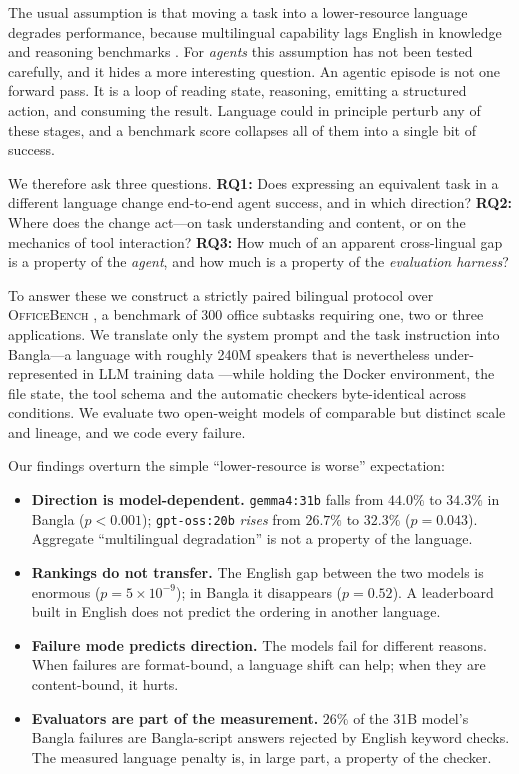 \documentclass[11pt]{article}
\begin{document}
The usual assumption is that moving a task into a lower-resource language degrades performance,
because multilingual capability lags English in knowledge and reasoning benchmarks
\citep{ahuja2023mega,shi2023mgsm,bandarkar2024belebele,huang2023notall}. For \emph{agents} this
assumption has not been tested carefully, and it hides a more interesting question. An agentic
episode is not one forward pass. It is a loop of reading state, reasoning, emitting a
structured action, and consuming the result. Language could in principle perturb any of these
stages, and a benchmark score collapses all of them into a single bit of success.

We therefore ask three questions.
\textbf{RQ1:} Does expressing an equivalent task in a different language change end-to-end
agent success, and in which direction?
\textbf{RQ2:} Where does the change act---on task understanding and content, or on the
mechanics of tool interaction?
\textbf{RQ3:} How much of an apparent cross-lingual gap is a property of the \emph{agent}, and
how much is a property of the \emph{evaluation harness}?

To answer these we construct a strictly paired bilingual protocol over \textsc{OfficeBench}
\citep{wang2024officebench}, a benchmark of 300 office subtasks requiring one, two or three
applications. We translate only the system prompt and the task instruction into Bangla---a
language with roughly 240M speakers that is nevertheless under-represented in LLM training
data \citep{joshi2020state}---while holding the Docker environment, the file state, the tool
schema and the automatic checkers byte-identical across conditions. We evaluate two
open-weight models of comparable but distinct scale and lineage, and we code every failure.

Our findings overturn the simple ``lower-resource is worse'' expectation:

\begin{itemize}[noitemsep,topsep=2pt]
\item \textbf{Direction is model-dependent.} \texttt{gemma4:31b} falls from $44.0\%$ to
$34.3\%$ in Bangla ($p{<}0.001$); \texttt{gpt-oss:20b} \emph{rises} from $26.7\%$ to $32.3\%$
($p{=}0.043$). Aggregate ``multilingual degradation'' is not a property of the language.
\item \textbf{Rankings do not transfer.} The English gap between the two models is enormous
($p{=}5{\times}10^{-9}$); in Bangla it disappears ($p{=}0.52$). A leaderboard built in English
does not predict the ordering in another language.
\item \textbf{Failure mode predicts direction.} The models fail for different reasons. When
failures are format-bound, a language shift can help; when they are content-bound, it hurts.
\item \textbf{Evaluators are part of the measurement.} $26\%$ of the 31B model's Bangla
failures are Bangla-script answers rejected by English keyword checks. The measured language
penalty is, in large part, a property of the checker.
\end{itemize}
\end{document}
